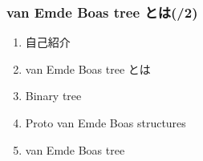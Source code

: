 \documentclass[main]{subfiles}
\begin{document}
\begin{frame}\frametitle{van Emde Boas tree とは(/2)}
	\begin{enumerate}
		\item 自己紹介
		\item van Emde Boas tree とは
		\item Binary tree
		\item Proto van Emde Boas structures
		\item van Emde Boas tree
	\end{enumerate}
\end{frame}
\end{document}
